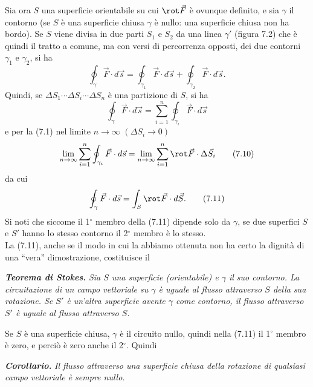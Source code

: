 Sia ora $S$ una superficie orientabile su cui $\rot\vec F$ \`e ovunque definito,
e sia $\gamma$ il contorno (se $S$ \`e una superficie chiusa $\gamma$ \`e nullo:
una superficie chiusa non ha bordo). Se $S$ viene divisa in due parti $S_1$ e
$S_2$ da una linea $\gamma'$ (figura 7.2) che \`e quindi il tratto a comune, ma
con versi di percorrenza opposti, dei due contorni $\gamma_1$ e $\gamma_2$, si
ha
\begin{equation}
  \oint_\gamma\vec F\cdot d\vec s=\oint_{\gamma_1}\vec F\cdot d\vec s
  +\oint_{\gamma_2}\vec F\cdot d\vec s.
  \tag{7.8}
\end{equation}
Quindi, se $\Delta S_1\cdots\Delta S_i\cdots\Delta S_n$ \`e una partizione di
$S$, si ha
\begin{equation}
  \oint_\gamma\vec F\cdot d\vec s
  =\sum_{i=1}^n\oint_{\gamma_i}\vec F\cdot d\vec s
  \tag{7.9}
\end{equation}
e per la (7.1) nel limite $n\to\infty$ \quad $(\Delta S_i\to0)$
\begin{equation}
  \lim_{n\to\infty}\sum_{i=1}^n\oint_{\gamma_i}\vec F\cdot d\vec s
  =\lim_{n\to\infty}\sum_{i=1}^n\rot\vec F\cdot\Delta\vec S_i
  \tag{7.10}
\end{equation}
da cui
\begin{equation}
  \oint_\gamma\vec F\cdot d\vec s=\int_S\rot\vec F\cdot d\vec S.
  \tag{7.11}
\end{equation}
Si noti che siccome il 1$^\circ$ membro della (7.11) dipende solo da $\gamma$,
se due superfici $S$ e $S'$ hanno lo stesso contorno il 2$^\circ$ membro \`e lo
stesso.\\
La (7.11), anche se il modo in cui la abbiamo ottenuta non ha certo la dignit\`a
di una ``vera'' dimostrazione, costituisce il

\textbf{\textit{Teorema di Stokes.}} \textit{Sia $S$ una superficie
(orientabile) e $\gamma$ il suo contorno. La circuitazione di un campo
vettoriale su $\gamma$ \`e uguale al flusso attraverso $S$ della sua rotazione.
Se $S'$ \`e un'altra superficie avente $\gamma$ come contorno, il flusso
attraverso $S'$ \`e uguale al flusso attraverso $S$.}

Se $S$ \`e una superficie chiusa, $\gamma$ \`e il circuito nullo, quindi nella
(7.11) il 1$^\circ$ membro \`e zero, e perci\`o \`e zero anche il 2$^\circ$.
Quindi

\textbf{\textit{Corollario.}} \textit{Il flusso attraverso una superficie chiusa
della rotazione di qualsiasi campo vettoriale \`e sempre nullo.}


